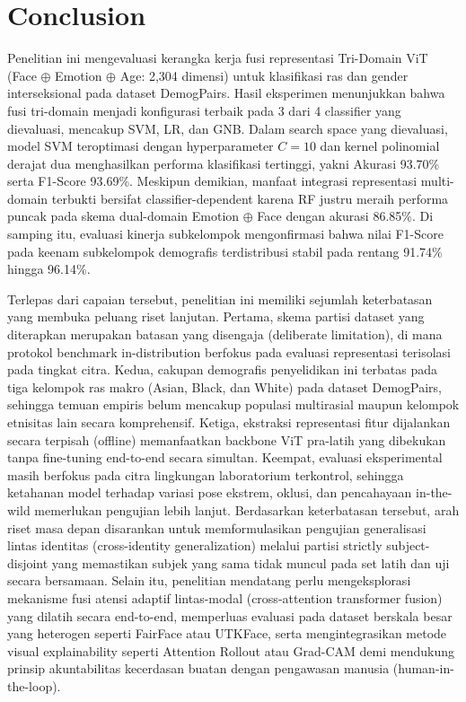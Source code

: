\section{Conclusion}
\label{sec:conclusion}

Penelitian ini mengevaluasi kerangka kerja fusi representasi Tri-Domain ViT (Face $\oplus$ Emotion $\oplus$ Age: 2,304 dimensi) untuk klasifikasi ras dan gender interseksional pada dataset DemogPairs. Hasil eksperimen menunjukkan bahwa fusi tri-domain menjadi konfigurasi terbaik pada 3 dari 4 classifier yang dievaluasi, mencakup SVM, LR, dan GNB. Dalam search space yang dievaluasi, model SVM teroptimasi dengan hyperparameter $C=10$ dan kernel polinomial derajat dua menghasilkan performa klasifikasi tertinggi, yakni Akurasi 93.70\% serta F1-Score 93.69\%. Meskipun demikian, manfaat integrasi representasi multi-domain terbukti bersifat classifier-dependent karena RF justru meraih performa puncak pada skema dual-domain Emotion $\oplus$ Face dengan akurasi 86.85\%. Di samping itu, evaluasi kinerja subkelompok mengonfirmasi bahwa nilai F1-Score pada keenam subkelompok demografis terdistribusi stabil pada rentang 91.74\% hingga 96.14\%.

Terlepas dari capaian tersebut, penelitian ini memiliki sejumlah keterbatasan yang membuka peluang riset lanjutan. Pertama, skema partisi dataset yang diterapkan merupakan batasan yang disengaja (deliberate limitation), di mana protokol benchmark in-distribution berfokus pada evaluasi representasi terisolasi pada tingkat citra. Kedua, cakupan demografis penyelidikan ini terbatas pada tiga kelompok ras makro (Asian, Black, dan White) pada dataset DemogPairs, sehingga temuan empiris belum mencakup populasi multirasial maupun kelompok etnisitas lain secara komprehensif. Ketiga, ekstraksi representasi fitur dijalankan secara terpisah (offline) memanfaatkan backbone ViT pra-latih yang dibekukan tanpa fine-tuning end-to-end secara simultan. Keempat, evaluasi eksperimental masih berfokus pada citra lingkungan laboratorium terkontrol, sehingga ketahanan model terhadap variasi pose ekstrem, oklusi, dan pencahayaan in-the-wild memerlukan pengujian lebih lanjut. Berdasarkan keterbatasan tersebut, arah riset masa depan disarankan untuk memformulasikan pengujian generalisasi lintas identitas (cross-identity generalization) melalui partisi strictly subject-disjoint yang memastikan subjek yang sama tidak muncul pada set latih dan uji secara bersamaan. Selain itu, penelitian mendatang perlu mengeksplorasi mekanisme fusi atensi adaptif lintas-modal (cross-attention transformer fusion) yang dilatih secara end-to-end, memperluas evaluasi pada dataset berskala besar yang heterogen seperti FairFace atau UTKFace, serta mengintegrasikan metode visual explainability seperti Attention Rollout atau Grad-CAM demi mendukung prinsip akuntabilitas kecerdasan buatan dengan pengawasan manusia (human-in-the-loop).

